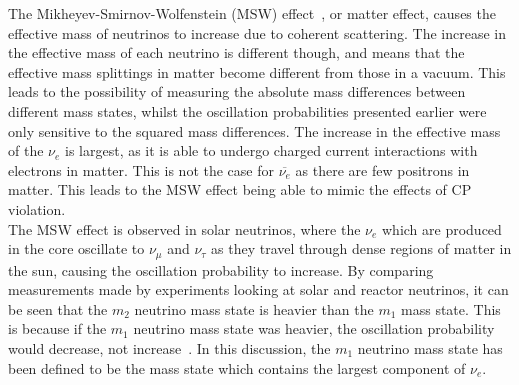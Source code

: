 The Mikheyev-Smirnov-Wolfenstein (MSW) effect~\citep{PhysRevD.17.2369, Mikheev:1986gs}, or matter effect, causes the effective mass of neutrinos to increase due to coherent scattering. The increase in the effective mass of each neutrino is different though, and means that the effective mass splittings in matter become different from those in a vacuum. This leads to the possibility of measuring the absolute mass differences between different mass states, whilst the oscillation probabilities presented earlier were only sensitive to the squared mass differences. The increase in the effective mass of the $\nu_{e}$ is largest, as it is able to undergo charged current interactions with electrons in matter. This is not the case for $\overline{\nu_{e}}$ as there are few positrons in matter. This leads to the MSW effect being able to mimic the effects of CP violation. \\

The MSW effect is observed in solar neutrinos, where the $\nu_{e}$ which are produced in the core oscillate to $\nu_{\mu}$ and $\nu_{\tau}$ as they travel through dense regions of matter in the sun, causing the oscillation probability to increase. By comparing measurements made by experiments looking at solar and reactor neutrinos, it can be seen that the $m_{2}$ neutrino mass state is heavier than the $m_{1}$ mass state. This is because if the $m_{1}$ neutrino mass state was heavier, the oscillation probability would decrease, not increase~\citep{Fogli2004149}. In this discussion, the $m_{1}$ neutrino mass state has been defined to be the mass state which contains the largest component of $\nu_{e}$. \\

